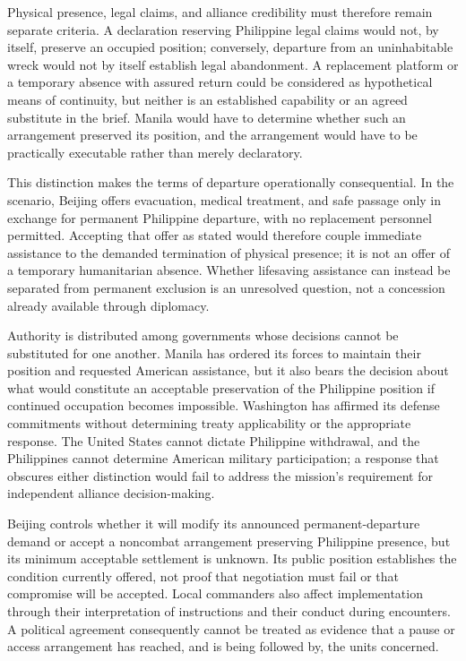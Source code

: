 \documentclass[11pt]{article}
\begin{document}
Physical presence, legal claims, and alliance credibility must therefore remain separate criteria. A declaration reserving Philippine legal claims would not, by itself, preserve an occupied position; conversely, departure from an uninhabitable wreck would not by itself establish legal abandonment. A replacement platform or a temporary absence with assured return could be considered as hypothetical means of continuity, but neither is an established capability or an agreed substitute in the brief. Manila would have to determine whether such an arrangement preserved its position, and the arrangement would have to be practically executable rather than merely declaratory.

This distinction makes the terms of departure operationally consequential. In the scenario, Beijing offers evacuation, medical treatment, and safe passage only in exchange for permanent Philippine departure, with no replacement personnel permitted. Accepting that offer as stated would therefore couple immediate assistance to the demanded termination of physical presence; it is not an offer of a temporary humanitarian absence. Whether lifesaving assistance can instead be separated from permanent exclusion is an unresolved question, not a concession already available through diplomacy.

Authority is distributed among governments whose decisions cannot be substituted for one another. Manila has ordered its forces to maintain their position and requested American assistance, but it also bears the decision about what would constitute an acceptable preservation of the Philippine position if continued occupation becomes impossible. Washington has affirmed its defense commitments without determining treaty applicability or the appropriate response. The United States cannot dictate Philippine withdrawal, and the Philippines cannot determine American military participation; a response that obscures either distinction would fail to address the mission's requirement for independent alliance decision-making.

Beijing controls whether it will modify its announced permanent-departure demand or accept a noncombat arrangement preserving Philippine presence, but its minimum acceptable settlement is unknown. Its public position establishes the condition currently offered, not proof that negotiation must fail or that compromise will be accepted. Local commanders also affect implementation through their interpretation of instructions and their conduct during encounters. A political agreement consequently cannot be treated as evidence that a pause or access arrangement has reached, and is being followed by, the units concerned.
\end{document}
